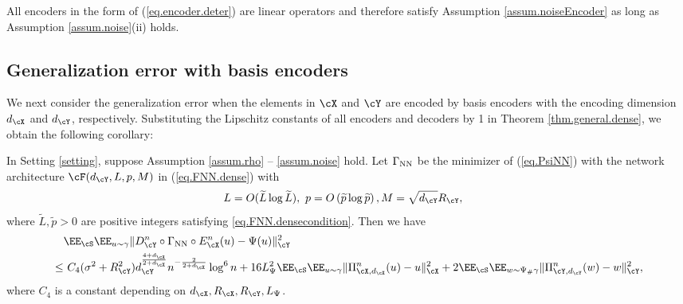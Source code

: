 \documentclass[11pt]{article} %
\begin{document}
\begin{remark}
	All encoders in the form of (\ref{eq.encoder.deter}) are linear operators and therefore satisfy Assumption \ref{assum.noiseEncoder} as long as Assumption \ref{assum.noise}(ii) holds.
\end{remark}

\subsection{Generalization error with basis encoders}

We next consider the generalization error when the elements in $\cX$ and $\cY$ are encoded by basis encoders with the encoding dimension $d_{\cX}$ and $d_{\cY}$, respectively. 
Substituting the Lipschitz constants of all encoders and decoders by 1 in Theorem \ref{thm.general.dense}, we obtain the following corollary:
\begin{corollary}\label{coro.basis.dense}
	In Setting \ref{setting},
	suppose Assumption \ref{assum.rho} -- \ref{assum.noise} hold. Let $\Gamma_{\rm NN}$ be the minimizer of (\ref{eq.PsiNN}) with the network architecture $\cF(d_{\cY},L,p,M)$ in (\ref{eq.FNN.dense}) with
	\begin{equation}
		\begin{aligned}
			&L=O(\widetilde{L}\log \widetilde{L}), \ p=O\left(\widetilde{p} \log \widetilde{p}\right), M=\sqrt{d_{\cY}}R_{\cY},
		\end{aligned}
	\label{eq.NN.parameter.n.dense.deter}
	\end{equation}
	where $\widetilde{L},\widetilde{p}>0$ are positive integers satisfying \eqref{eq.FNN.densecondition}.
	Then we have
	\begin{align}
		&\EE_{\cS}\EE_{u\sim \gamma}\|D_{\cY}^n\circ \Gamma_{\rm NN} \circ E_{\cX}^n(u)- \Psi(u)\|_{\cY}^2 \nonumber\\
		\leq&\ C_{4}(\sigma^2+R_{\cY}^2)d_{\cY}^{\frac{4+d_{\cX}}{2+d_{\cX}}}n^{-\frac{2}{2+d_{\cX}}}\log^6 n  +  16 L_{\Psi}^2\EE_{\cS}\EE_{u\sim \gamma}\| \Pi_{\cX,d_{\cX}}^n(u)- u\|_{\cX}^2+2\EE_{\cS}\EE_{w\sim \Psi_{\#}\gamma}\|\Pi_{\cY,d_{\cY}}^n(w)- w\|_{\cY}^2,
		\label{eq.error.general.basis.dense}
	\end{align}
	where $C_{4}$ is a constant depending on $d_{\cX},R_{\cX}, R_{\cY},L_{\Psi}$.
\end{corollary}
\end{document}
